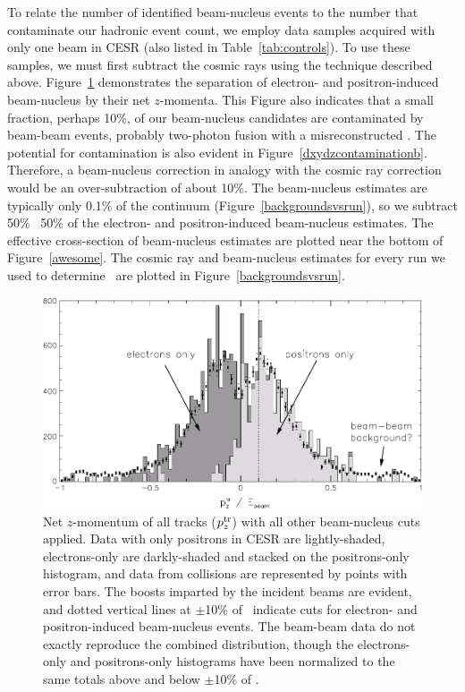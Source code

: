 \documentclass{cornell}
\begin{document}
To relate the number of identified beam-nucleus events to the number
that contaminate our hadronic event count, we employ data samples
acquired with only one beam in CESR (also listed in
Table~\ref{tab:controls}).  To use these samples, we must first
subtract the cosmic rays using the technique described above.
Figure~\ref{beamgaspz} demonstrates the separation of electron- and
positron-induced beam-nucleus by their net $z$-momenta.  This Figure
also indicates that a small fraction, perhaps 10\%, of our
beam-nucleus candidates are contaminated by beam-beam events, probably
two-photon fusion with a misreconstructed \dz.  The potential for
contamination is also evident in Figure~\ref{dxydzcontaminationb}.
Therefore, a beam-nucleus correction in analogy with the cosmic ray
correction would be an over-subtraction of about 10\%.  The
beam-nucleus estimates are typically only 0.1\% of the continuum
(Figure~\ref{backgroundsvsrun}), so we subtract 50\% \PM\ 50\% of the
electron- and positron-induced beam-nucleus estimates.  The effective
cross-section of beam-nucleus estimates are plotted near the bottom of
Figure~\ref{awesome}.  The cosmic ray and beam-nucleus estimates for
every run we used to determine \gee\ are plotted in
Figure~\ref{backgroundsvsrun}.

\begin{figure}[p]
  \begin{center}
    \includegraphics[width=\linewidth]{plots/beamgaspz}
  \end{center}
  \caption[Distinguishing electron- and positron-induced beam-nucleus
  events with $z$ momentum]{\label{beamgaspz} Net $z$-momentum of all
  tracks ($p_z^{\mbox{\scriptsize tr}}$) with all other beam-nucleus cuts applied.
  Data with only positrons in CESR are lightly-shaded, electrons-only
  are darkly-shaded and stacked on the positrons-only histogram, and
  data from collisions are represented by points with error bars.  The
  boosts imparted by the incident beams are evident, and dotted
  vertical lines at $\pm$10\% of \ebeam\ indicate cuts for electron-
  and positron-induced beam-nucleus events.  The beam-beam data do not
  exactly reproduce the combined distribution, though the
  electrons-only and positrons-only histograms have been normalized to
  the same totals above and below $\pm$10\% of \ebeam.}
\end{figure}
\end{document}
